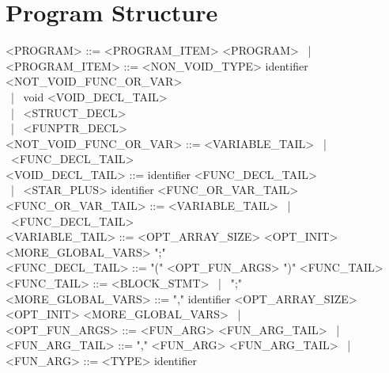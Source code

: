 \section{Program Structure}
\begin{grammar}
<PROGRAM> ::= <PROGRAM_ITEM> <PROGRAM> \ | \ \epsilon \\

<PROGRAM_ITEM> ::= <NON_VOID_TYPE> identifier <NOT_VOID_FUNC_OR_VAR> \\
    \ | \ void <VOID_DECL_TAIL> \\
    \ | \ <STRUCT_DECL> \\
    \ | \ <FUNPTR_DECL> \\

<NOT_VOID_FUNC_OR_VAR> ::= <VARIABLE_TAIL> \ | \ <FUNC_DECL_TAIL> \\

<VOID_DECL_TAIL> ::= identifier <FUNC_DECL_TAIL> \\
    \ | \ <STAR_PLUS> identifier <FUNC_OR_VAR_TAIL> \\

<FUNC_OR_VAR_TAIL> ::= <VARIABLE_TAIL> \ | \ <FUNC_DECL_TAIL> \\

<VARIABLE_TAIL> ::= <OPT_ARRAY_SIZE> <OPT_INIT> <MORE_GLOBAL_VARS> ";" \\

<FUNC_DECL_TAIL> ::= "(" <OPT_FUN_ARGS> ")" <FUNC_TAIL> \\

<FUNC_TAIL> ::= <BLOCK_STMT> \ | \ ";" \\

<MORE_GLOBAL_VARS> ::= "," identifier <OPT_ARRAY_SIZE> <OPT_INIT> <MORE_GLOBAL_VARS> \ | \ \epsilon \\

<OPT_FUN_ARGS> ::= <FUN_ARG> <FUN_ARG_TAIL> \ | \ \epsilon \\

<FUN_ARG_TAIL> ::= "," <FUN_ARG> <FUN_ARG_TAIL> \ | \ \epsilon \\

<FUN_ARG> ::= <TYPE> identifier
\end{grammar}

